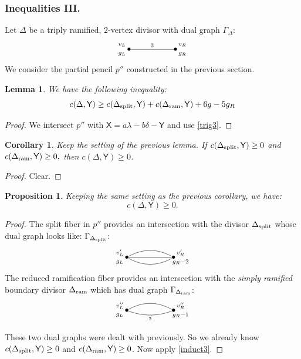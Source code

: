 \documentclass[reqno, 10 pt]{article}
\newtheorem{lem}[thm]{Lemma}
\newtheorem{prop}[thm]{Proposition}
\newtheorem{cor}[thm]{Corollary}
\theoremstyle{definition}
\theoremstyle{remark}
\numberwithin{equation}{section}
\numberwithin{thm}{section}
\numberwithin{prop}{section}
\numberwithin{lem}{section}
\numberwithin{cor}{section}
\numberwithin{conj}{section}
\numberwithin{defn}{section}
\newcommand{\sfY}{{\mathsf Y}}
\newcommand{\sfX}{{\mathsf X}}
\newcommand {\spl}{{\rm split}}
\newcommand {\ram}{{\rm ram}}
\begin{document}
\subsubsection{Inequalities III.} Let $\Delta$ be a triply ramified, $2$-vertex divisor with dual graph $\Gamma_\Delta$: \[   \xygraph{
!{<0cm,0cm>;<1cm,0cm>:<0cm,1cm>::}
!{(0,0) }*{\bullet}="l"!{(-.3,.2)}{\scriptstyle v_L}!{(-.3,-.2)}{\scriptstyle g_L}
!{(2,0) }*{\bullet}="r"!{(2.3,.2)}{\scriptstyle v_R}!{(2.3,-.2)}{\scriptstyle g_R}
"l"-"r" ^{3}
}  \]  
We consider the partial pencil $p''$ constructed in the previous section.   

\begin{lem}
We have the following inequality: 
\begin{equation}
c(\Delta, {\sfY}) \geq c(\Delta_{\spl}, {\sfY}) + c(\Delta_{\ram}, {\sfY}) + 6g-5g_R
\end{equation}
\end{lem}

\begin{proof}
We intersect $p''$ with $\sfX = a\lambda - b\delta - {\sfY}$ and use \autoref{trig3}.
\end{proof}

\begin{cor}\label{induct3}
Keep the setting of the previous lemma. If $c(\Delta_{\spl}, {\sfY}) \geq 0$ and $c(\Delta_{\ram}, {\sfY}) \geq 0,$  then $c(\Delta, {\sfY}) \geq 0 $.
\end{cor}

\begin{proof}
Clear.
\end{proof}

\begin{prop}\label{induct3}
Keeping the same setting as the previous corollary, we have: 
$$c(\Delta, \sfY) \geq 0.$$
\end{prop}

\begin{proof}
The split fiber in $p''$ provides an intersection with the divisor $\Delta_{\spl}$ whose dual graph looks like:
 $\Gamma_{\Delta_{\spl}}$: \[ \xygraph{
!{<0cm,0cm>;<1cm,0cm>:<0cm,1cm>::}
!{(0,0) }*{\bullet}="l"!{(-.3,.2)}{\scriptstyle v'_L}!{(-.3,-.21)}{\scriptstyle g_L}
!{(2,0) }*{\bullet}="r"!{(2.3,.2)}{\scriptstyle v'_R}!{(2.3,-.2)}{\scriptstyle g_R - 2}
 "l"-@/^.3cm/"r" 
"l"-"r" 
"l"-@/_.3cm/"r" 
}  \]  The reduced ramification fiber provides an intersection with the {\sl simply ramified} boundary divisor $\Delta_{\ram}$ which has dual graph $\Gamma_{\Delta_{\ram}}$:\[  \xygraph{
!{<0cm,0cm>;<1cm,0cm>:<0cm,1cm>::}
!{(0,0) }*{\bullet}="l"!{(-.3,.2)}{\scriptstyle v''_L}!{(-.3,-.2)}{\scriptstyle g_L}
!{(2,0) }*{\bullet}="r"!{(2.3,.2)}{\scriptstyle v''_R}!{(2.3,-.2)}{\scriptstyle g_R-1}
 "l"-@/^.3cm/"r"  
"l"-@/_.2cm/"r"_{\scriptscriptstyle2}
}  \]

These two dual graphs were dealt with previously.  So we already know $c(\Delta_{\spl}, \sfY) \geq 0$ and $c(\Delta_{\ram}, \sfY) \geq 0$. Now apply \autoref{induct3}.
 \end{proof}
 
\end{document}
